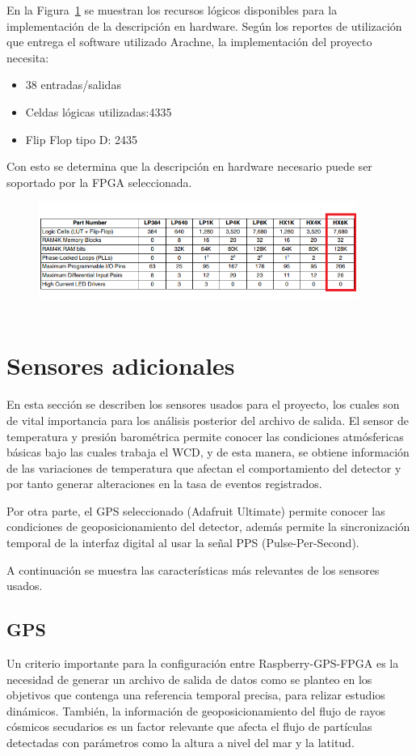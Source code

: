 \noindent En la Figura~\ref{adecuacion2} se muestran los recursos lógicos disponibles para la implementación de la descripción en hardware.
Según los reportes de utilización que entrega el software utilizado Arachne, la implementación del proyecto necesita:
\begin{itemize}
    \item 38 entradas/salidas
    \item Celdas lógicas utilizadas:4335
    \item Flip Flop tipo D: 2435
\end{itemize}
Con esto se determina que la descripción en hardware necesario puede ser soportado por la FPGA seleccionada.

\begin{figure}[H]
\includegraphics[width=0.93\textwidth]{Figs/tabla.png} 
\centering
\caption[Recursos lógicos de la FPGA Icoboard]{~\citep{LatticeSemiconductor2017}}
\label{adecuacion2}
\end{figure}


\section{Sensores adicionales}
En esta sección se describen los sensores usados para el proyecto, los cuales son de vital importancia para los análisis posterior del archivo de salida. El sensor de temperatura y presión barométrica permite conocer las condiciones atmósfericas básicas bajo las cuales trabaja el WCD, y de esta manera, se obtiene información de las variaciones de temperatura que afectan el comportamiento del detector y por tanto generar alteraciones en la tasa de eventos registrados.

Por otra parte, el GPS seleccionado (Adafruit Ultimate) permite conocer las condiciones de geoposicionamiento del detector, además permite la sincronización temporal de la interfaz digital al usar la señal PPS (Pulse-Per-Second).

A continuación se muestra las características más relevantes de los sensores usados.

\subsection{GPS}
Un criterio importante para la configuración entre Raspberry-GPS-FPGA es la necesidad de generar un archivo de salida de datos como se planteo en los objetivos que contenga una referencia temporal precisa, para relizar estudios dinámicos.
También, la información de geoposicionamiento del flujo de rayos cósmicos secudarios es un factor relevante que afecta el flujo de partículas detectadas con parámetros como la altura a nivel del mar y la latitud.


